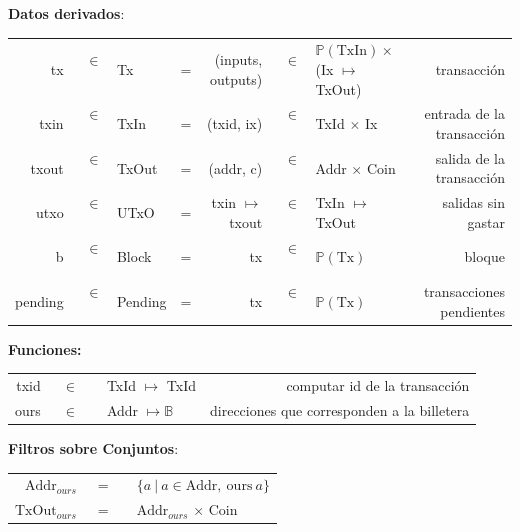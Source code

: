 \documentclass[12pt]{book}
\begin{document}
\textbf{Datos derivados}:

\begin{center}
    \begin{tabular}{ r @{} c @{} l c r @{} c @{} l r}
        tx &\ $\in$\ \ & Tx           & = & (inputs, outputs) &\ $\in$\ \ & $\mathbb{P}(\text{TxIn}) \times$ (Ix $\mapsto$ TxOut) & transacción \\
        txin &\ $\in$\ \ & TxIn       & = & (txid, ix) &\ $\in$\ \ & TxId $\times$ Ix & entrada de la transacción \\
        txout &\ $\in$\ \ & TxOut     & = & (addr, c) &\ $\in$\ \ & Addr $\times$ Coin & salida de la transacción \\
        utxo &\ $\in$\ \ & UTxO       & = & txin $\mapsto$ txout &\ $\in$\ \ & TxIn $\mapsto$ TxOut & salidas sin gastar \\
        b &\ $\in$\ \ & Block         & = & tx &\ $\in$\ \ & $\mathbb{P}(\text{Tx})$ & bloque \\
        pending &\ $\in$\ \ & Pending & = & tx &\ $\in$\ \ & $\mathbb{P}(\text{Tx})$ & transacciones pendientes
    \end{tabular}
\end{center}

\textbf{Funciones:}

\begin{center}
    \begin{tabular}{ r @{} c @{} l r }
        txid &\ $\in$\ \ & TxId $\mapsto$ TxId & computar id de la transacción \\
        ours &\ $\in$\ \ & Addr $\mapsto \mathbb{B}$ & direcciones que corresponden a la billetera \\
    \end{tabular}
\end{center}

\textbf{Filtros sobre Conjuntos}:

\begin{center}
    \begin{tabular}{ r @{} c @{} l}
        $\text{Addr}_{ours}$ &\ =\ \ & $\{a\ |\ a \in \text{Addr},\ \text{ours}\ a\}$ \\
        $\text{TxOut}_{ours}$ &\ =\ \ & $\text{Addr}_{ours}$ $\times$ Coin \\
    \end{tabular}
\end{center}

\end{document}
